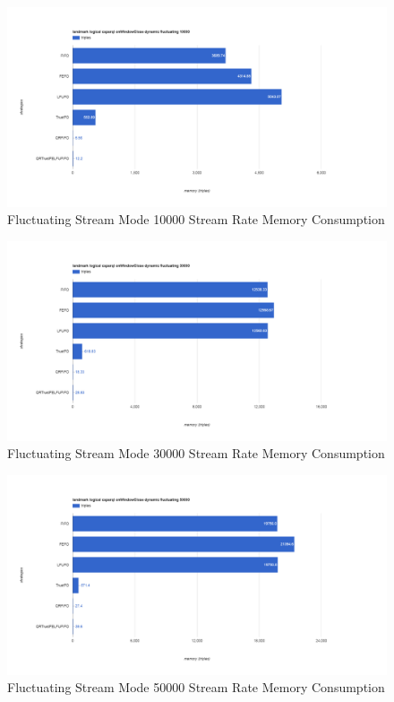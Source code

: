 \begin{figure}[!htbp]
    \centering
    \includegraphics[width=\textwidth]{img/app3-f-10000-m.png}
    \caption{Fluctuating Stream Mode 10000 Stream Rate Memory Consumption}
\end{figure}
\begin{figure}[!htbp]
    \centering
    \includegraphics[width=\textwidth]{img/app3-f-30000-m.png}
    \caption{Fluctuating Stream Mode 30000 Stream Rate Memory Consumption}
\end{figure}
\begin{figure}[!htbp]
    \centering
    \includegraphics[width=\textwidth]{img/app3-f-50000-m.png}
    \caption{Fluctuating Stream Mode 50000 Stream Rate Memory Consumption}
\end{figure}
